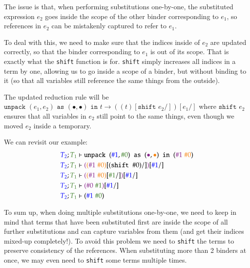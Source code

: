 \documentclass[runningheads]{article}
\begin{document}
The issue is that, when performing substitutions one-by-one, the substituted expression $e_2$ goes inside the scope of the other binder corresponding to $e_1$, so references in $e_2$ can be mistakenly captured to refer to $e_1$.

To deal with this, we need to make sure that the indices inside of $e_2$ are updated correctly, so that the binder corresponding to $e_1$ is out of its scope. That is exactly what the \texttt{shift} function is for. \texttt{shift} simply increases all indices in a term by one, allowing us to go inside a scope of a binder, but without binding to it (so that all variables still reference the same things from the outside).

The updated reduction rule will be $\texttt{unpack } (e_1, e_2) \texttt{ as } (\bullet, \bullet) \texttt{ in } t \longrightarrow ((t)[\texttt{shift }e_2/])[e_1/]$ where $\texttt{shift }e_2$ ensures that all variables in $e_2$ still point to the same things, even though we moved $e_2$ inside a temporary.

We can revisit our example:
\begin{align*}
{\color{blue}T_2}; {\color{OliveGreen}T_1} &\vdash \texttt{unpack } ({\color{blue}\#1}, {\color{OliveGreen}\#0}) \texttt{ as } ({\color{Fuchsia}\bullet}, {\color{BurntOrange}\bullet}) \texttt{ in } ({\color{Fuchsia}\#1} \; {\color{BurntOrange}\#0}) \\
{\color{blue}T_2}; {\color{OliveGreen}T_1} &\vdash {\color{Fuchsia}(}{\color{BurntOrange}({\color{Fuchsia}\#1} \; {\color{BurntOrange}\#0})}[{(\texttt{shift }\#0)}/]{\color{Fuchsia})}[{\color{blue}\#1}/] \\
{\color{blue}T_2}; {\color{OliveGreen}T_1} &\vdash {\color{Fuchsia}(}{\color{BurntOrange}({\color{Fuchsia}\#1} \; {\color{BurntOrange}\#0})}[{\color{OliveGreen}\#1}/]{\color{Fuchsia})}[{\color{blue}\#1}/] \\
{\color{blue}T_2}; {\color{OliveGreen}T_1} &\vdash {\color{Fuchsia}(}{\color{Fuchsia}\#0} \; {\color{OliveGreen}\#1}{\color{Fuchsia})}[{\color{blue}\#1}/] \\
{\color{blue}T_2}; {\color{OliveGreen}T_1} &\vdash ({\color{blue}\#1} \; {\color{OliveGreen}\#0})
\end{align*}

To sum up, when doing multiple substitutions one-by-one, we need to keep in mind that terms that have been substituted first are inside the scope of all further substitutions and can capture variables from them (and get their indices mixed-up completely!). To avoid this problem we need to \texttt{shift} the terms to preserve consistency of the references. When substituting more than 2 binders at once, we may even need to \texttt{shift} some terms multiple times.
\end{document}
